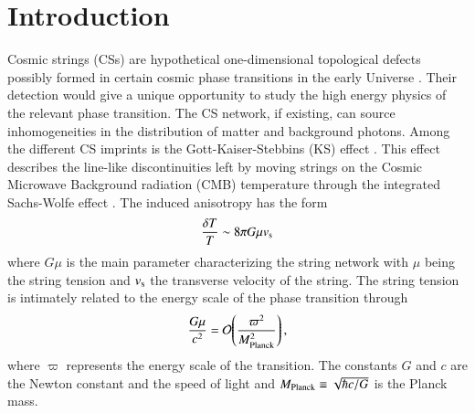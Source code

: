 \documentclass[fleqn,usenatbib]{mnras}
\newcommand{\order}[1]{\mathcal{O}\!\left(#1\right)}
\begin{document}
\section{Introduction}
Cosmic strings (CSs) are hypothetical one-dimensional topological defects possibly formed in certain cosmic phase transitions in the early Universe \citep{Kibble:1976sj,Zeldovich:1980gh,Vilenkin:1981iu,
Vachaspati:1984dz,Vilenkin:1984ib,Shellard:1987bv,
Hindmarsh:1994re,Vilenkin:2000jqa,Sakellariadou:2006qs,
Bevis:2007gh,Depies:2009im,Bevis:2010gj,
Copeland:1994vg,Sakellariadou:1997zt,Sarangi:2002yt,
Copeland:2003bj,Pogosian:2003mz,Majumdar:2002hy,
Dvali:2003zj,Kibble:2004hq,HenryTye:2006uv}.
Their detection would give a unique opportunity to study the high energy physics of the relevant phase transition. 
The CS network, if existing, can source inhomogeneities in the distribution of matter and background photons. 
Among the different CS imprints is the Gott-Kaiser-Stebbins (KS) effect \citep{Kaiser:1984iv}. This effect describes the line-like discontinuities left by moving strings on the Cosmic Microwave Background radiation (CMB) temperature  through the integrated Sachs-Wolfe effect
\citep{lazanu2015constraints,Gott:1985,Stebbins:1988,bouchet1988microwave,allen1997cmb,pen1997power,ringeval2012all}.
The induced anisotropy has the form \citep{Hindmarsh:1993pu,Stebbins:1995}
\begin{equation}
\frac{\delta T}{T} \sim 8 \pi G\mu v_{\rm s}
\end{equation}
where $G\mu$ is the main parameter characterizing the string network with  $\mu$ being the string tension and  $v_{\rm s}$ the transverse velocity of the string. 
The string tension  is intimately related to 
the energy scale of the phase transition through 
\begin{equation}
\frac{G\mu}{c^2}=\order{\frac{\varpi^2}{M_{\rm Planck}^2}},
\end{equation}
where   $\varpi$ represents the energy scale of the transition. The constants $G$  and $c$ are the Newton constant and the speed of light and $M_{\rm Planck}\equiv\sqrt{\hbar c/G}$ is the Planck mass. 
\end{document}
